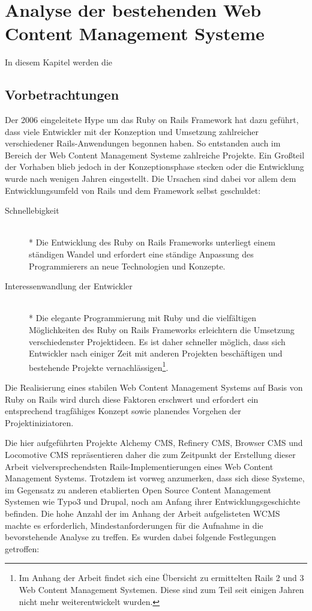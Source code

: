 \chapter{Analyse der bestehenden Web Content Management Systeme}

In diesem Kapitel werden die

\section{Vorbetrachtungen}
Der 2006 eingeleitete Hype um das Ruby on Rails Framework hat dazu geführt, dass viele Entwickler mit der Konzeption und Umsetzung zahlreicher verschiedener Rails-Anwendungen begonnen haben. So entstanden auch im Bereich der Web Content Management Systeme zahlreiche Projekte. Ein Großteil der Vorhaben blieb jedoch in der Konzeptionsphase stecken oder die Entwicklung wurde nach wenigen Jahren eingestellt. Die Ursachen sind dabei vor allem dem Entwicklungsumfeld von Rails und dem Framework selbst geschuldet:


\begin{description}
\item[Schnellebigkeit]\mbox{~}\\*
Die Entwicklung des Ruby on Rails Frameworks unterliegt einem ständigen Wandel und erfordert eine ständige Anpassung des Programmierers an neue Technologien und Konzepte.
\item[Interessenwandlung der Entwickler]\mbox{~}\\*
Die elegante Programmierung mit Ruby und die vielfältigen Möglichkeiten des Ruby on Rails Frameworks erleichtern die Umsetzung verschiedenster Projektideen.
Es ist daher schneller möglich, dass sich Entwickler nach einiger Zeit mit anderen Projekten beschäftigen und bestehende Projekte vernachlässigen\footnote{Im Anhang der Arbeit findet sich eine Übersicht zu ermittelten Rails 2 und 3 Web Content Management Systemen. Diese sind zum Teil seit einigen Jahren nicht mehr weiterentwickelt wurden.}.
\end{description}

Die Realisierung eines stabilen Web Content Management Systems auf Basis von Ruby on Rails wird durch diese Faktoren erschwert und erfordert ein entsprechend tragfähiges Konzept sowie planendes Vorgehen der Projektiniziatoren.

Die hier aufgeführten Projekte Alchemy CMS, Refinery CMS, Browser CMS und Locomotive CMS repräsentieren daher die zum Zeitpunkt der Erstellung dieser Arbeit vielversprechendsten Rails-Implementierungen eines Web Content Management Systems. Trotzdem ist vorweg anzumerken, dass sich diese Systeme, im Gegensatz zu anderen etablierten Open Source Content Management Systemen wie Typo3 und Drupal, noch am Anfang ihrer Entwicklungsgeschichte befinden.
\newline
\newline
Die hohe Anzahl der im Anhang der Arbeit aufgelisteten WCMS machte es erforderlich, Mindestanforderungen für die Aufnahme in die bevorstehende Analyse zu treffen. Es wurden dabei folgende Festlegungen getroffen:

